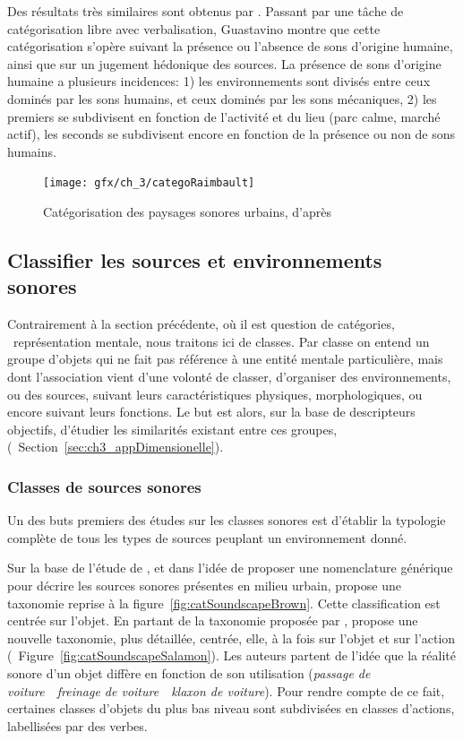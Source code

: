 Des résultats très similaires sont obtenus par \citep{guastavino2007categorization}. Passant par une tâche de catégorisation libre avec verbalisation, Guastavino montre que cette catégorisation s'opère suivant la présence ou l'absence de sons d'origine humaine, ainsi que sur un jugement hédonique des sources. La présence de sons d'origine humaine a plusieurs incidences: 1) les environnements sont divisés entre ceux dominés par les sons humains, et ceux dominés par les sons mécaniques, 2) les premiers se subdivisent en fonction de l'activité et du lieu (parc calme, marché actif), les seconds se subdivisent encore en fonction de la présence ou non de sons humains.

\begin{figure}[t]
        \myfloatalign
        \texttt{[image: gfx/ch\_3/categoRaimbault]}
        \caption[Catégorisation des paysages sonores urbains.]{Catégorisation des paysages sonores urbains, d'après \citep{raimbault2005urban}}\label{fig:catSoundscapeRaimbault}
\end{figure}

\subsection{Classifier les sources et environnements sonores}

Contrairement à la section précédente, où il est question de catégories, \ie~représentation mentale, nous traitons ici de classes. Par classe on entend un groupe d'objets qui ne fait pas référence à une entité mentale particulière, mais dont l'association vient d'une volonté de classer, d'organiser des environnements, ou des sources, suivant leurs caractéristiques physiques, morphologiques, ou encore suivant leurs fonctions. Le but est alors, sur la base de descripteurs objectifs, d'étudier les similarités existant entre ces groupes, (\cf~Section~\ref{sec:ch3_appDimensionelle}).


\subsubsection{Classes de sources sonores}

Un des buts premiers des études sur les classes sonores est d'établir la typologie complète de tous les types de sources peuplant un environnement donné.

Sur la base de l'étude de \citep{raimbault2005urban}, et dans l'idée de proposer une nomenclature générique pour décrire les sources sonores présentes en milieu urbain, \citep{brown2011towards} propose une taxonomie reprise à la figure~\ref{fig:catSoundscapeBrown}. Cette classification est centrée sur l'objet. En partant de la taxonomie proposée par \citep{brown2011towards}, \citep{Salamon14} propose une nouvelle taxonomie, plus détaillée, centrée, elle, à la fois sur l'objet et sur l'action (\cf~Figure~\ref{fig:catSoundscapeSalamon}). Les auteurs partent de l'idée que la réalité sonore d'un objet diffère en fonction de son utilisation (\emph{passage de voiture}~\vs~\emph{freinage de voiture}~\vs~\emph{klaxon de voiture}). Pour rendre compte de ce fait,  certaines classes d'objets du plus bas niveau sont subdivisées en classes d'actions, labellisées par des verbes.

